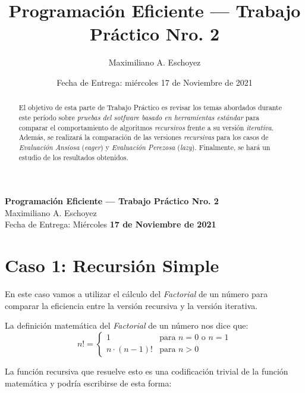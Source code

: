 \documentclass[a4paper,11pt]{article}
\title{Programación Eficiente --- Trabajo Práctico Nro. 2}
\author{Maximiliano A. Eschoyez}
\date{Fecha de Entrega: miércoles 17 de Noviembre de 2021}
\begin{document}




\begin{center}
  {\Large \textbf{Programación Eficiente --- Trabajo Práctico Nro. 2}}\\[.25cm]

  {\large Maximiliano A. Eschoyez}\\[.25cm]
  
  {Fecha de Entrega: Miércoles \textbf{17 de Noviembre de 2021}}
\end{center}

\begin{abstract}
    El objetivo de esta parte de Trabajo Práctico es revisar los temas
    abordados durante este período sobre \emph{pruebas del sotfware
    basado en herramientas estándar} para comparar el comportamiento
    de algoritmos \emph{recursivos} frente a su versión \emph{iterativa}.
    Además, se realizará la comparación de las versiones \emph{recursivas}
    para los casos de \emph{Evaluación Ansiosa} (\emph{eager}) y \emph{Evaluación Perezosa} (\emph{lazy}). Finalmente, se hará un estudio
    de los resultados obtenidos.
\end{abstract}

\section*{Caso 1: Recursión Simple}

En este caso vamos a utilizar el cálculo del \emph{Factorial} de un número para comparar la eficiencia entre la versión recursiva y la versión iterativa.

La definición matemática del \emph{Factorial} de un número nos dice que:
\begin{equation*}
    n! = \left\{ \begin{array}{ll}
        1                & \text{para } n = 0 \text{ o } n = 1 \\
        n \cdot (n - 1)! & \text{para } n > 0
    \end{array} \right.
\end{equation*}

La función recursiva que resuelve esto es una codificación trivial de la función matemática y podría escribirse de esta forma:
\end{document}
